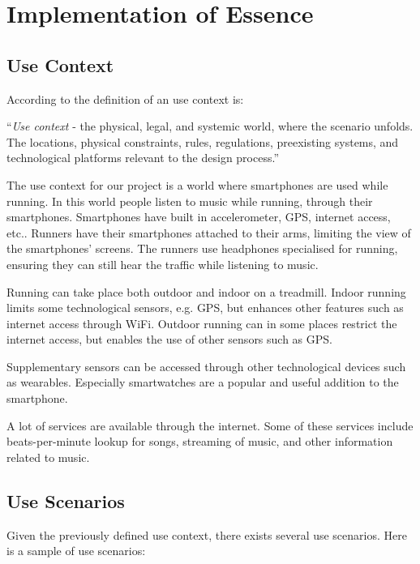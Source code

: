 \section{Implementation of Essence}
\subsection{Use Context}
According to \cite[page 83]{essence} the definition of an use context is:
\begin{center}
	“\textit{Use context} - the physical, legal, and systemic world, where the scenario unfolds.
	 The locations, physical constraints, rules, regulations, preexisting systems, and technological platforms relevant to the design process.”
\end{center}

The use context for our project is a world where smartphones are used while running.
In this world people listen to music while running, through their smartphones.
Smartphones have built in accelerometer, GPS, internet access, etc..
Runners have their smartphones attached to their arms, limiting the view of the smartphones' screens.
The runners use headphones specialised for running, ensuring they can still hear the traffic while listening to music.

Running can take place both outdoor and indoor on a treadmill.
Indoor running limits some technological sensors, e.g. GPS, but enhances other features such as internet access through WiFi.
Outdoor running can in some places restrict the internet access, but enables the use of other sensors such as GPS.

Supplementary sensors can be accessed through other technological devices such as wearables.
Especially smartwatches are a popular and useful addition to the smartphone.

A lot of services are available through the internet.
Some of these services include beats-per-minute lookup for songs, streaming of music, and other information related to music.


\subsection{Use Scenarios}
Given the previously defined use context, there exists several use scenarios.
Here is a sample of use scenarios:

